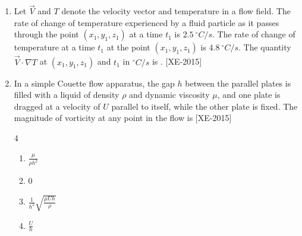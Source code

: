 \documentclass[journal]{IEEEtran}
\begin{document}
\begin{enumerate}
\begin{multicols}{4}
\begin{enumerate}
    \item $-10$
    \item $0$
    \item $5$
    \item $10$
\end{enumerate}
\end{multicols}

\item Let $\vec{V}$ and $T$ denote the velocity vector and temperature in a flow field. The rate of change of temperature experienced by a fluid particle as it passes through the point $(x_1, y_1, z_1)$ at a time $t_1$ is $2.5 \ ^\circ C/s$. The rate of change of temperature at a time $t_1$ at the point $(x_1, y_1, z_1)$ is $4.8 \ ^\circ C/s$. The quantity $\vec{V} \cdot \nabla T$ at $(x_1, y_1, z_1)$ and $t_1$ in $^\circ C/s$ is \underline{\hspace{2cm}}. \hfill{[XE-2015]}\\



\item In a simple Couette flow apparatus, the gap $h$ between the parallel plates is filled with a liquid of density $\rho$ and dynamic viscosity $\mu$, and one plate is dragged at a velocity of $U$ parallel to itself, while the other plate is fixed. The magnitude of vorticity at any point in the flow is \hfill{[XE-2015]} 
\begin{multicols}{4}
    

\begin{enumerate}
    \item $\frac{\mu}{\rho h^2}$
    \item $0$
    \item $\frac{1}{h^2} \sqrt{\frac{\mu U h}{\rho}}$
    \item $\frac{U}{h}$
\end{enumerate}

\end{multicols}

\end{enumerate}
  
\end{document}
